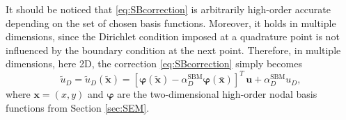 \documentclass{article}
\renewcommand{\phi}{\varphi}
\begin{document}
It should be noticed that \eqref{eq:SBcorrection} is arbitrarily high-order accurate depending on the set of chosen basis functions. Moreover, it holds in multiple dimensions, since the Dirichlet condition imposed at a quadrature point is not influenced by the boundary condition at the next point. Therefore, in multiple dimensions, here 2D, the correction \eqref{eq:SBcorrection} simply becomes
%
\begin{equation}\label{eq:SBcorrection2D}
\tilde{u}_D = \tilde{u}_D(\tilde{\boldsymbol{x}}) = [\boldsymbol{\phi}(\tilde{\boldsymbol{x}})-\alpha_D^{\text{SBM}}\boldsymbol{\phi}(\bar{\boldsymbol{x}})]^T\, \boldsymbol{u} + \alpha_D^{\text{SBM}}u_D, 
\end{equation}
%
where $\boldsymbol{x} = (x, y)$ and $\boldsymbol{\phi}$ are the two-dimensional high-order nodal basis functions from Section \ref{sec:SEM}.
\end{document}
